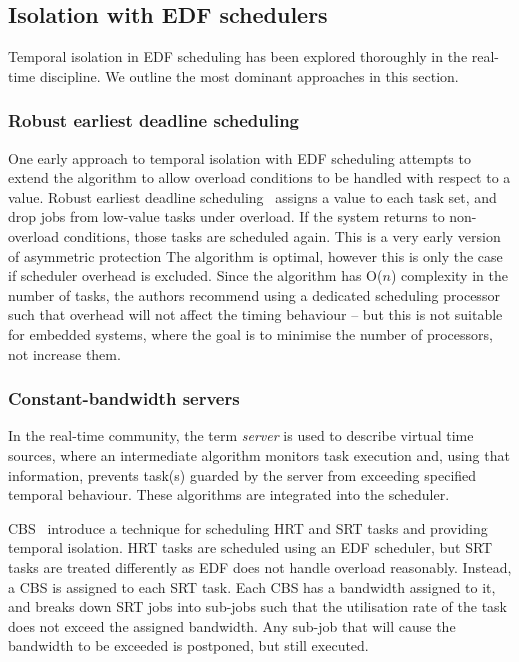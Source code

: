 \subsection{Isolation with EDF schedulers}

Temporal isolation in \gls{EDF} scheduling has been explored thoroughly in the real-time discipline.
We outline the most dominant approaches in this section.

\subsubsection{Robust earliest deadline scheduling}

One early approach to temporal isolation with \gls{EDF} scheduling attempts to extend the 
algorithm to allow overload conditions to be handled with respect to a value. Robust earliest deadline
scheduling~\citep{Buttazzo_Stankovic_93} assigns a value to each task set, and drop jobs from
low-value tasks under overload. If the system returns to non-overload conditions, those tasks are
scheduled again. This is a very early version of asymmetric protection
The algorithm is optimal, however this is only the case if
scheduler overhead is excluded.  Since the algorithm has O($n$) complexity in the number of
tasks, the authors recommend using a dedicated scheduling processor such that overhead will not
affect the timing behaviour -- but this is not suitable for embedded systems, where the goal is to
minimise the number of processors, not increase them.

\subsubsection{Constant-bandwidth servers}

In the real-time community, the term \emph{server} is used to describe virtual time sources, where
an intermediate algorithm monitors task execution and, using that information, prevents task(s)
guarded by the server from exceeding specified temporal behaviour. These algorithms are integrated
into the scheduler.

\Gls{CBS}~\citep{Abeni_Buttazzo_04} introduce a technique for scheduling \gls{HRT} and
\gls{SRT} tasks and providing temporal isolation.  \gls{HRT} tasks are scheduled using an \gls{EDF}
scheduler, but \gls{SRT} tasks are treated differently as \gls{EDF} does not handle overload
reasonably.
Instead, a \gls{CBS} is assigned to each \gls{SRT} task.  Each \gls{CBS} has a bandwidth assigned to
it, and breaks down \gls{SRT} jobs into sub-jobs such that the utilisation rate of the task does not
exceed the assigned bandwidth.  Any sub-job that will cause the bandwidth to be exceeded is
postponed, but still executed.

